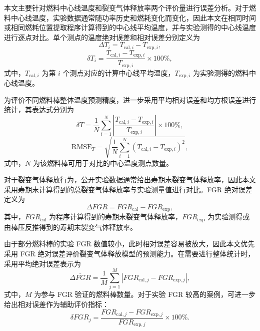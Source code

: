 \label{section:error_evalution_metrics}
本文主要针对燃料中心线温度和裂变气体释放率两个评价量进行误差分析。对于燃料中心线温度，实验数据通常随功率历史和燃耗变化而变化，因此本文在相同时间或相同燃耗位置提取程序计算得到的中心线平均温度，并与实验测得的中心线温度进行逐点对比。单个测点的温度绝对误差和相对误差分别定义为
\begin{equation}
	\Delta T_i = T_{\mathrm{cal},i}-T_{\mathrm{exp},i},
\end{equation}
\begin{equation}
	\delta T_i = \frac{T_{\mathrm{cal},i}-T_{\mathrm{exp},i}}{T_{\mathrm{exp},i}}\times 100\%,
\end{equation}
式中，$T_{\mathrm{cal},i}$ 为第 $i$ 个测点对应的计算中心线平均温度，$T_{\mathrm{exp},i}$ 为实验测得的燃料中心线温度。

为评价不同燃料棒整体温度预测精度，进一步采用平均相对误差和均方根误差进行统计，其表达式分别为
\begin{equation}
	\overline{\delta T} =
	\frac{1}{N}\sum_{i=1}^{N}
	\left|
	\frac{T_{\mathrm{cal},i}-T_{\mathrm{exp},i}}{T_{\mathrm{exp},i}}
	\right|\times 100\%,
\end{equation}
\begin{equation}
	\mathrm{RMSE}_T =
	\sqrt{
		\frac{1}{N}\sum_{i=1}^{N}
		\left(T_{\mathrm{cal},i}-T_{\mathrm{exp},i}\right)^2
	},
\end{equation}
式中，$N$ 为该燃料棒可用于对比的中心温度测点数量。

对于裂变气体释放行为，公开实验数据通常给出寿期末裂变气体释放率，因此本文采用寿期末计算得到的总裂变气体释放率与实验测量值进行对比。FGR 绝对误差定义为
\begin{equation}
	\Delta FGR = FGR_{\mathrm{cal}} - FGR_{\mathrm{exp}},
\end{equation}
其中，$FGR_{\mathrm{cal}}$ 为程序计算得到的寿期末裂变气体释放率，$FGR_{\mathrm{exp}}$ 为实验测得或由棒压反推得到的寿期末裂变气体释放率。

由于部分燃料棒的实验 FGR 数值较小，此时相对误差容易被放大，因此本文优先采用 FGR 绝对误差评价裂变气体释放模型的预测能力。在需要进行整体统计时，采用平均绝对误差表示为
\begin{equation}
	\overline{\Delta FGR} =
	\frac{1}{M}\sum_{j=1}^{M}
	\left|FGR_{\mathrm{cal},j}-FGR_{\mathrm{exp},j}\right|,
\end{equation}
式中，$M$ 为参与 FGR 验证的燃料棒数量。对于实验 FGR 较高的案例，可进一步给出相对误差作为辅助评价指标：
\begin{equation}
	\delta FGR_j =
	\frac{FGR_{\mathrm{cal},j}-FGR_{\mathrm{exp},j}}
	{FGR_{\mathrm{exp},j}}\times 100\%.
\end{equation}

